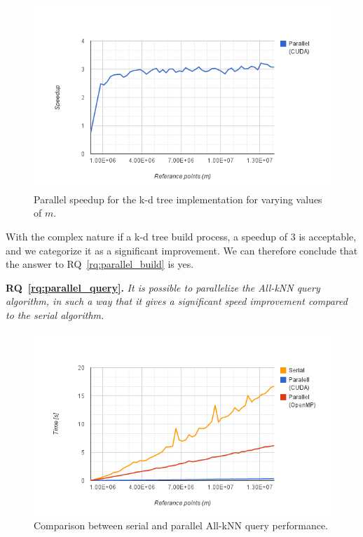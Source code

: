 \begin{figure}[ht!]
    \centering
    \includegraphics[width=120mm]{../gfx/final_tree_build_speedup.png}
    \caption{Parallel speedup for the k-d tree implementation for varying values of $m$.}
    \label{fig:final_tree_build_speedup}
\end{figure}

With the complex nature if a k-d tree build process, a speedup of $3$ is acceptable, and we categorize it as a significant improvement. We can therefore conclude that the answer to RQ~\ref{rq:parallel_build} is yes. 


\textbf{RQ~\ref{rq:parallel_query}.} \emph{It is possible to parallelize the All-kNN query algorithm, in such a way that it gives a significant speed improvement compared to the serial algorithm.}


\begin{figure}[ht]
    \centering
    \includegraphics[width=120mm]{../gfx/final_kd_search.png}
    \caption{Comparison between serial and parallel All-kNN query performance.}
    \label{fig:final_kd_search}
\end{figure}

